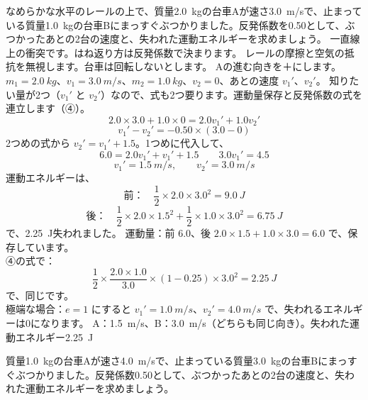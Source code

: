 \label{ph:力-3:ex9}
\begin{phreidai}
なめらかな水平のレールの上で、質量\qty{2.0}{kg}の台車Aが速さ\qty{3.0}{m/s}で、止まっている質量\qty{1.0}{kg}の台車Bにまっすぐぶつかりました。反発係数を0.50として、ぶつかったあとの2台の速度と、失われた運動エネルギーを求めましょう。
\phbamen
一直線上の衝突です。はね返り方は反発係数で決まります。
\phmushi
レールの摩擦と空気の抵抗を無視します。台車は回転しないとします。
\phzu
Aの進む向きを＋にします。$m_1=\qty{2.0}{kg}$、$v_1=\qty{3.0}{m/s}$、$m_2=\qty{1.0}{kg}$、$v_2=0$、あとの速度 $v_1'$、$v_2'$。
\phriyu
知りたい量が2つ（$v_1'$ と $v_2'$）なので、式も2つ要ります。運動量保存と反発係数の式を連立します（④）。
\phtateru
\[2.0\times3.0+1.0\times0=2.0v_1'+1.0v_2'\]
\[v_1'-v_2'=-0.50\times(3.0-0)\]
\phtoku
2つめの式から $v_2'=v_1'+1.5$。1つめに代入して、
\[6.0=2.0v_1'+v_1'+1.5\qquad 3.0v_1'=4.5\]
\[v_1'=\qty{1.5}{m/s},\qquad v_2'=\qty{3.0}{m/s}\]
運動エネルギーは、
\[\text{前：}\quad\frac{1}{2}\times2.0\times3.0^2=\qty{9.0}{J}\]
\[\text{後：}\quad\frac{1}{2}\times2.0\times1.5^2+\frac{1}{2}\times1.0\times3.0^2=\qty{6.75}{J}\]
で、\qty{2.25}{J}失われました。
\phtashikame
運動量：前 6.0、後 $2.0\times1.5+1.0\times3.0=6.0$ で、保存しています。\\
④の式で：
\[\frac{1}{2}\times\frac{2.0\times1.0}{3.0}\times(1-0.25)\times3.0^2=\qty{2.25}{J}\]
で、同じです。\\
極端な場合：$e=1$ にすると $v_1'=\qty{1.0}{m/s}$、$v_2'=\qty{4.0}{m/s}$ で、失われるエネルギーは0になります。
\kotae A：\qty{1.5}{m/s}、B：\qty{3.0}{m/s}（どちらも同じ向き）。失われた運動エネルギー\qty{2.25}{J}
\end{phreidai}
\begin{jibun}
質量\qty{1.0}{kg}の台車Aが速さ\qty{4.0}{m/s}で、止まっている質量\qty{3.0}{kg}の台車Bにまっすぐぶつかりました。反発係数0.50として、ぶつかったあとの2台の速度と、失われた運動エネルギーを求めましょう。
\end{jibun}

